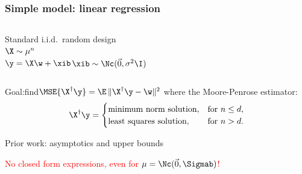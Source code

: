 \begin{frame}
  \frametitle{Simple model: linear regression}
  \begin{columns}
    \begin{column}{0.5\textwidth}
      \vspace{2mm}
      
      Standard i.i.d.~random design\\
$\X\sim\mu^n$\\
$\y=\X\w+\xib$\qquad$\xib\sim\Nc(\vec{0},\sigma^2\I)$
    \end{column}
    \begin{column}{0.4\textwidth}
    \end{column}
  \end{columns}
  
  \pause
  
  Goal:\quad find\quad$\MSE{\X^\dagger\y}=\E\,\|\X^\dagger\y-\w\|^2$ where
  the
  Moore-Penrose estimator:
  \begin{align*}
    \X^\dagger\y =
      \begin{cases}
        \text{minimum norm solution},& \text{for }n\leq d,\\
        \text{least squares solution},& \text{for }n>d.
      \end{cases}
  \end{align*}
  
  \pause

    Prior work: asymptotics \cite{HMRT19_TR} and upper bounds
    \cite{BLLT19_TR}
    
  \textcolor{red}{No closed form expressions, even for
    $\mu=\Nc(\vec{0},\Sigmab)$!}
\end{frame}

